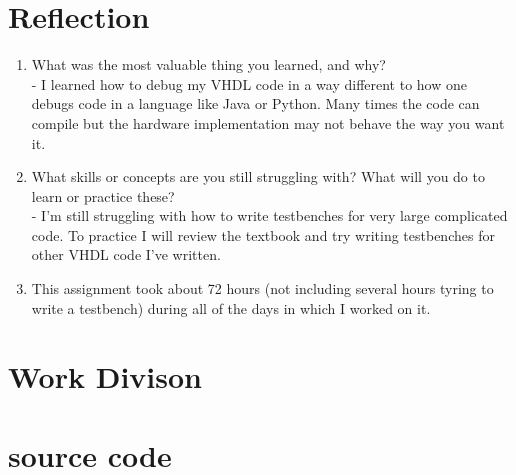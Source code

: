 \documentclass[12pt]{article}
\begin{document}
\begin{flushleft}
\begin{enumerate}
\end{enumerate}

\section{Reflection} 

\begin{enumerate}
    \item What was the most valuable thing you learned, and why?\\
        - I learned how to debug my VHDL code in a way different to how one
debugs code in a language like Java or Python. Many times the code can compile
but the hardware implementation may not behave the way you want it.
    \item What skills or concepts are you still struggling with? What will you do to 
          learn or practice these?\\
        - I'm still struggling with how to write testbenches for very large
complicated code. To practice I will review the textbook and try writing
testbenches for other VHDL code I've written. 
    \item This assignment took about 72 hours (not including several hours
tyring to write a testbench) during all of the  days in which I
worked on it. 

\end{enumerate}

\section{Work Divison} 

\section{source code}


\end{flushleft}
\end{document}
